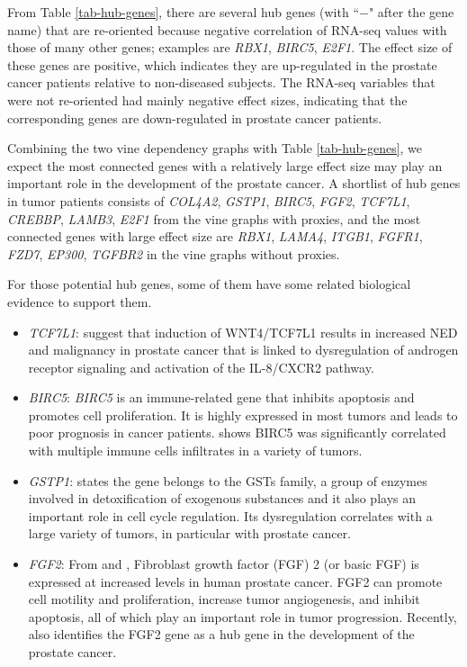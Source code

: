 \documentclass[a4paper]{article}
\begin{document}
From Table \ref{tab-hub-genes}, there are several hub genes (with
``$-$" after the gene name) that are re-oriented because negative
correlation of RNA-seq values with those of many other genes; examples
are \textit{RBX1}, \textit{BIRC5}, \textit{E2F1}.  The effect size of
these genes are positive, which indicates they are up-regulated in the
prostate cancer patients relative to non-diseased subjects.  The
RNA-seq variables that were not re-oriented had mainly negative effect
sizes, indicating that the corresponding genes are down-regulated in
prostate cancer patients.

Combining the two vine dependency graphs with Table
\ref{tab-hub-genes}, we expect the most connected genes with a
relatively large effect size may play an important role in the
development of the prostate cancer. A shortlist of hub genes in tumor
patients consists of \textit{COL4A2}, \textit{GSTP1}, \textit{BIRC5},
\textit{FGF2}, \textit{TCF7L1}, \textit{CREBBP}, \textit{LAMB3},
\textit{E2F1} from the vine graphs with proxies, and the most
connected genes with large effect size are \textit{RBX1},
\textit{LAMA4}, \textit{ITGB1}, \textit{FGFR1}, \textit{FZD7},
\textit{EP300}, \textit{TGFBR2} in the vine graphs without proxies.

For those potential hub genes, some of them have some related
biological evidence to support them.

\begin{itemize}
\item \textit{TCF7L1}: \cite{wen2021tcf7l1} suggest that induction of
  WNT4/TCF7L1 results in increased NED and malignancy in prostate
  cancer that is linked to dysregulation of androgen receptor
  signaling and activation of the IL-8/CXCR2 pathway.
    
\item \textit{BIRC5}: \textit{BIRC5} is an immune-related gene that
  inhibits apoptosis and promotes cell proliferation.  It is highly
  expressed in most tumors and leads to poor prognosis in cancer
  patients. \cite{xu2021birc5} shows BIRC5 was significantly
  correlated with multiple immune cells infiltrates in a variety of
  tumors.
    
\item \textit{GSTP1}: \cite{martignano2016gstp1} states the gene
  belongs to the GSTs family, a group of enzymes involved in
  detoxification of exogenous substances and it also plays an
  important role in cell cycle regulation. Its dysregulation
  correlates with a large variety of tumors, in particular with
  prostate cancer.
    
\item \textit{FGF2}: From \cite{giri1999alterations} and
  \cite{polnaszek2003fibroblast}, Fibroblast growth factor (FGF) 2 (or
  basic FGF) is expressed at increased levels in human prostate
  cancer. FGF2 can promote cell motility and proliferation, increase
  tumor angiogenesis, and inhibit apoptosis, all of which play an
  important role in tumor progression.  Recently,
  \cite{liu2020identification} also identifies the FGF2 gene as a hub
  gene in the development of the prostate cancer.

\end{itemize}
\end{document}
